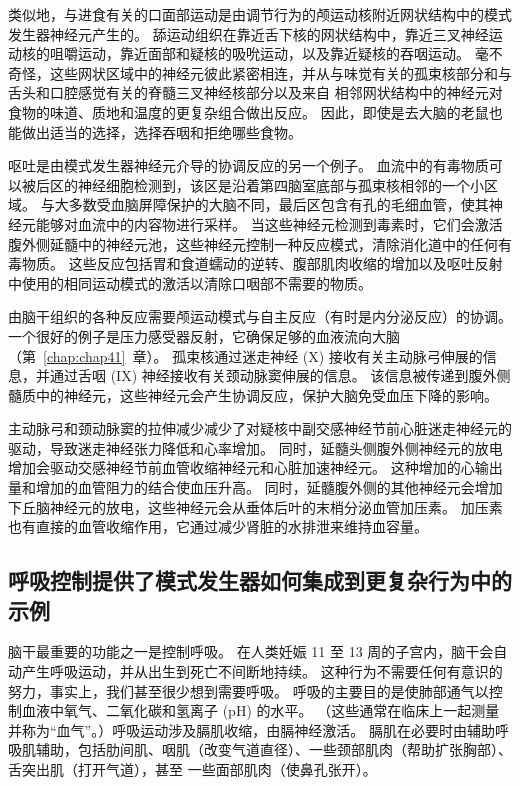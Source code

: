 类似地，与进食有关的口面部运动是由调节行为的颅运动核附近网状结构中的模式发生器神经元产生的。
舔运动组织在靠近舌下核的网状结构中，靠近三叉神经运动核的咀嚼运动，靠近面部和疑核的吸吮运动，以及靠近疑核的吞咽运动。
毫不奇怪，这些网状区域中的神经元彼此紧密相连，并从与味觉有关的孤束核部分和与舌头和口腔感觉有关的脊髓三叉神经核部分以及来自 相邻网状结构中的神经元对食物的味道、质地和温度的更复杂组合做出反应。
因此，即使是去大脑的老鼠也能做出适当的选择，选择吞咽和拒绝哪些食物。


呕吐是由模式发生器神经元介导的协调反应的另一个例子。
血流中的有毒物质可以被后区的神经细胞检测到，该区是沿着第四脑室底部与孤束核相邻的一个小区域。
与大多数受血脑屏障保护的大脑不同，最后区包含有孔的毛细血管，使其神经元能够对血流中的内容物进行采样。
当这些神经元检测到毒素时，它们会激活腹外侧延髓中的神经元池，这些神经元控制一种反应模式，清除消化道中的任何有毒物质。
这些反应包括胃和食道蠕动的逆转、腹部肌肉收缩的增加以及呕吐反射中使用的相同运动模式的激活以清除口咽部不需要的物质。


由脑干组织的各种反应需要颅运动模式与自主反应（有时是内分泌反应）的协调。
一个很好的例子是压力感受器反射，它确保足够的血液流向大脑（第~\ref{chap:chap41}~章）。
孤束核通过迷走神经 (X) 接收有关主动脉弓伸展的信息，并通过舌咽 (IX) 神经接收有关颈动脉窦伸展的信息。
该信息被传递到腹外侧髓质中的神经元，这些神经元会产生协调反应，保护大脑免受血压下降的影响。


主动脉弓和颈动脉窦的拉伸减少减少了对疑核中副交感神经节前心脏迷走神经元的驱动，导致迷走神经张力降低和心率增加。
同时，延髓头侧腹外侧神经元的放电增加会驱动交感神经节前血管收缩神经元和心脏加速神经元。
这种增加的心输出量和增加的血管阻力的结合使血压升高。
同时，延髓腹外侧的其他神经元会增加下丘脑神经元的放电，这些神经元会从垂体后叶的末梢分泌血管加压素。
加压素也有直接的血管收缩作用，它通过减少肾脏的水排泄来维持血容量。



\subsection{呼吸控制提供了模式发生器如何集成到更复杂行为中的示例}

脑干最重要的功能之一是控制呼吸。
在人类妊娠 11 至 13 周的子宫内，脑干会自动产生呼吸运动，并从出生到死亡不间断地持续。
这种行为不需要任何有意识的努力，事实上，我们甚至很少想到需要呼吸。
呼吸的主要目的是使肺部通气以控制血液中氧气、二氧化碳和氢离子 (pH) 的水平。
（这些通常在临床上一起测量并称为“血气”。）呼吸运动涉及膈肌收缩，由膈神经激活。
膈肌在必要时由辅助呼吸肌辅助，包括肋间肌、咽肌（改变气道直径）、一些颈部肌肉（帮助扩张胸部）、舌突出肌（打开气道），甚至 一些面部肌肉（使鼻孔张开）。


